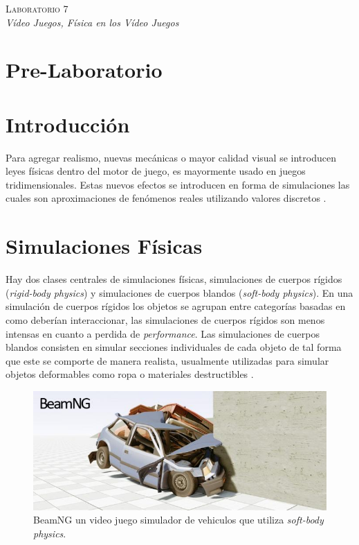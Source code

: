 \begin{center}
\textsc{\Large Laboratorio 7}~\\
\emph{\large Vídeo Juegos, Física en los Vídeo Juegos}
\end{center}

\section{Pre-Laboratorio}

\section{Introducción}
Para agregar realismo, nuevas mecánicas o mayor calidad visual se introducen leyes físicas dentro del motor de juego, es mayormente usado en juegos tridimensionales. Estas nuevos efectos se introducen en forma de simulaciones las cuales son aproximaciones de fenómenos reales utilizando valores discretos \cite{ian_gamephysics}.

\section{Simulaciones Físicas}
Hay dos clases centrales de simulaciones físicas, simulaciones de cuerpos rígidos (\emph{rigid-body physics}) y simulaciones de cuerpos blandos (\emph{soft-body physics}). En una simulación de cuerpos rígidos los objetos se agrupan entre categorías basadas en como deberían interaccionar, las simulaciones de cuerpos rígidos son menos intensas en cuanto a perdida de \emph{performance}. Las simulaciones de cuerpos blandos consisten en simular secciones individuales de cada objeto de tal forma que este se comporte de manera realista, usualmente utilizadas para simular objetos deformables como ropa o materiales destructibles \cite{ian_gamephysics}.
\begin{figure}[H]
\centering
\includegraphics[width=0.9\linewidth]{semana7/beamng_gamephysics.jpg} 
\caption{BeamNG un video juego simulador de vehiculos que utiliza \emph{soft-body physics}.}
\end{figure}

